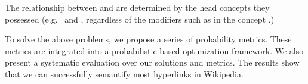\begin{example}
The  relationship between  and  are determined by the head concepts they possessed (e.g.\  and , regardless of the modifiers such as  in the concept .)
\label{exa:hc}
\end{example}








To solve the above problems, we propose a series of probability metrics.
These metrics are integrated into a probabilistic based optimization framework.
We also present a systematic evaluation over our solutions and metrics. The results show that we can successfully semantify most hyperlinks in Wikipedia.

